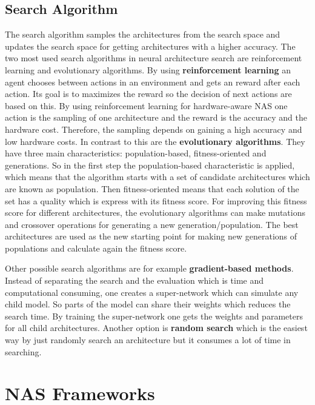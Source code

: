 \documentclass[conference]{IEEEtran}
\begin{document}
\subsection{Search Algorithm}
The search algorithm samples the architectures from the search space and updates the search space for getting architectures with a higher accuracy.
The two most used search algorithms in neural architecture search are reinforcement learning and evolutionary algorithms. By using \textbf{reinforcement learning} an agent chooses between actions in an environment and gets an reward after each action. Its goal is to maximizes the reward so the decision of next actions are based on this. By using reinforcement learning for hardware-aware NAS one action is the sampling of one architecture and the reward is the accuracy and the hardware cost. Therefore, the sampling depends on gaining a high accuracy and low hardware costs. In contrast to this are the \textbf{evolutionary algorithms}. They have three main characteristics: population-based, fitness-oriented and generations. So in the first step the population-based characteristic is applied, which means that the algorithm starts with a set of candidate architectures which are known as population. Then fitness-oriented means that each solution of the set has a quality which is express with its fitness score. For improving this fitness score for different architectures, the evolutionary algorithms can make mutations and crossover operations for generating a new generation/population. The best architectures are used as the new starting point for making new generations of populations and calculate again the fitness score. 

Other possible search algorithms are for example \textbf{gradient-based methods}. Instead of separating the search and the evaluation which is time and computational consuming, one creates a super-network which can simulate any child model. So parts of the model can share their weights which reduces the search time. By training the super-network one gets the weights and parameters for all child architectures. Another option is \textbf{random search} which is the easiest way by just randomly search an architecture but it consumes a lot of time in searching. 

\section{NAS Frameworks}
\label{section:Frameworks}
\end{document}
